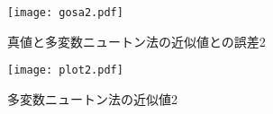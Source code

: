 \documentclass[uplatex, 11pt,a4j, titlepage]{jsarticle}
\begin{document}
\begin{figure}[h]
    \centering
    \texttt{[image: gosa2.pdf]}
    \caption{真値と多変数ニュートン法の近似値との誤差2}
    \label{gosa2}
\end{figure}

\begin{figure}[h]
    \centering
    \texttt{[image: plot2.pdf]}
    \caption{多変数ニュートン法の近似値2}
    \label{plot2}
\end{figure}

\newpage

\newpage
\thispagestyle{empty}
\nocite{key1}
\nocite{key2}


\end{document}
